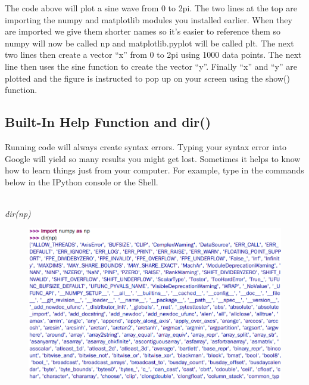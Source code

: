 The code above will plot a sine wave from 0 to 2pi. The two lines at
the top are importing the numpy and matplotlib modules you installed
earlier. When they are imported we give them shorter names so it’s
easier to reference them so numpy will now be called np and
matplotlib.pyplot will be called plt. The next two lines then create a
vector “x” from 0 to 2pi using 1000 data points. The next line then
uses the sine function to create the vector “y”. Finally “x” and “y”
are plotted and the figure is instructed to pop up on your screen
using the show() function.






\subsection{Built-In Help Function and dir()}

Running code will always create syntax errors. Typing your syntax
error into Google will yield so many results you might get
lost. Sometimes it helps to know how to learn things just from your
computer. For example, type in the commands below in the IPython
console or the Shell.

\\
{\it dir(np)}
\ \\

\begin{figure}[H]
  \begin{center}
    \includegraphics[width=\textwidth]{Figures/dir.png}
  \end{center}
\end{figure}

